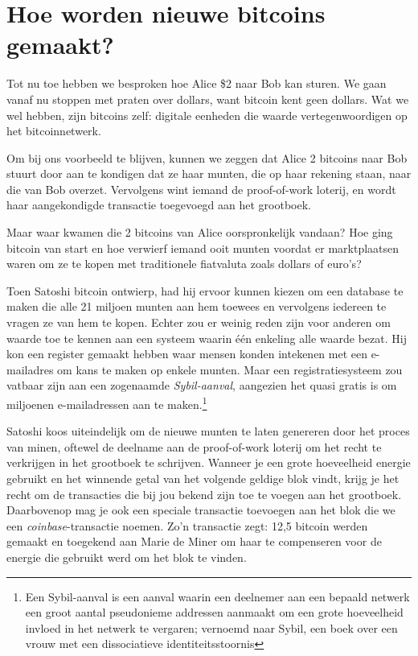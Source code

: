 \documentclass[
  letterpaper,
]{scrbook}
\begin{document}
\hypertarget{hoe-worden-nieuwe-bitcoins-gemaakt}{%
\section{Hoe worden nieuwe bitcoins
gemaakt?}\label{hoe-worden-nieuwe-bitcoins-gemaakt}}

Tot nu toe hebben we besproken hoe Alice \$2 naar Bob kan sturen. We
gaan vanaf nu stoppen met praten over dollars, want bitcoin kent geen
dollars. Wat we wel hebben, zijn bitcoins zelf: digitale eenheden die
waarde vertegenwoordigen op het bitcoinnetwerk.

Om bij ons voorbeeld te blijven, kunnen we zeggen dat Alice 2 bitcoins
naar Bob stuurt door aan te kondigen dat ze haar munten, die op haar
rekening staan, naar die van Bob overzet. Vervolgens wint iemand de
proof-of-work loterij, en wordt haar aangekondigde transactie toegevoegd
aan het grootboek.

Maar waar kwamen die 2 bitcoins van Alice oorspronkelijk vandaan? Hoe
ging bitcoin van start en hoe verwierf iemand ooit munten voordat er
marktplaatsen waren om ze te kopen met traditionele fiatvaluta zoals
dollars of euro's?

Toen Satoshi bitcoin ontwierp, had hij ervoor kunnen kiezen om een
database te maken die alle 21 miljoen munten aan hem toewees en
vervolgens iedereen te vragen ze van hem te kopen. Echter zou er weinig
reden zijn voor anderen om waarde toe te kennen aan een systeem waarin
één enkeling alle waarde bezat. Hij kon een register gemaakt hebben waar
mensen konden intekenen met een e-mailadres om kans te maken op enkele
munten. Maar een registratiesysteem zou vatbaar zijn aan een zogenaamde
\emph{Sybil-aanval}, aangezien het quasi gratis is om miljoenen
e-mailadressen aan te maken.\footnote{Een Sybil-aanval is een aanval
  waarin een deelnemer aan een bepaald netwerk een groot aantal
  pseudonieme addressen aanmaakt om een grote hoeveelheid invloed in het
  netwerk te vergaren; vernoemd naar Sybil, een boek over een vrouw met
  een dissociatieve identiteitsstoornis}

Satoshi koos uiteindelijk om de nieuwe munten te laten genereren door
het proces van minen, oftewel de deelname aan de proof-of-work loterij
om het recht te verkrijgen in het grootboek te schrijven. Wanneer je een
grote hoeveelheid energie gebruikt en het winnende getal van het
volgende geldige blok vindt, krijg je het recht om de transacties die
bij jou bekend zijn toe te voegen aan het grootboek. Daarbovenop mag je
ook een speciale transactie toevoegen aan het blok die we een
\emph{coinbase}-transactie noemen. Zo'n transactie zegt: 12,5 bitcoin
werden gemaakt en toegekend aan Marie de Miner om haar te compenseren
voor de energie die gebruikt werd om het blok te vinden.
\end{document}
